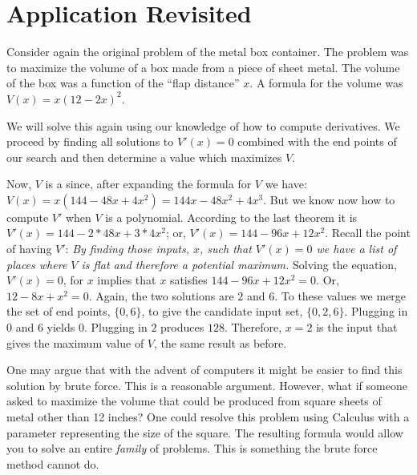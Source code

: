 \section{Application Revisited}
Consider again the original problem of the metal box container. The 
problem was to maximize the volume of a box made from a piece of sheet 
metal. The volume of the box was a function of 
the ``flap distance'' $x$. A formula for the volume was 
$V(x) = x (12 - 2x)^2$.

We will solve this again using our knowledge of how to compute derivatives. 
We proceed by finding all solutions to $V'(x) = 0$ combined with the end 
points of our search 
and then determine a value which maximizes $V$. 

Now, $V$ is a  since,
after expanding the formula for $V$ we have: 
$V(x) = x(144 - 48x + 4x^2) = 144x - 48x^2 + 4x^3$.
But we know now how to compute $V'$ when $V$ is a polynomial. According 
to the last theorem it is
$V'(x) = 144 - 2 * 48 x + 3 * 4 x^2$; or,
$V'(x) = 144 - 96 x + 12 x^2$.
Recall the point of having $V'$: {\it By finding those inputs, $x$, such that 
$V'(x) = 0$ we have a list of places where $V$ is flat and therefore a 
potential maximum.\/}
Solving the equation, $V'(x) = 0$, for $x$ implies that $x$ satisfies
$144 - 96 x + 12 x^2 = 0$. Or, $12 - 8 x + x^2 = 0$. Again, the two solutions
are $2$ and $6$. To these values we merge the set of end points, $\{0,6\}$, 
to give the candidate input set, $\{0,2,6\}$. Plugging in $0$ and $6$ 
yields $0$. 
Plugging in $2$ produces $128$. Therefore, $x=2$ is the input that gives 
the maximum value of $V$, the same result as before.

One may argue that with the advent of computers it might be easier 
to find this solution by brute force. This is a reasonable argument.
However, what if someone asked to maximize the volume that could be produced 
from square sheets of metal other than 12 inches? One could resolve 
this problem using Calculus with a parameter representing the 
size of the square. The resulting formula would allow you to solve
an entire {\it family\/} of problems. This is something the brute
force method cannot do.


